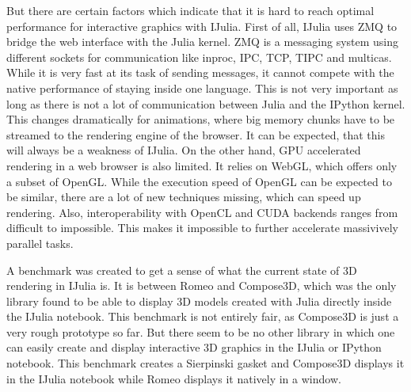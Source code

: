 But there are certain factors which indicate that it is hard to reach optimal performance for interactive graphics with IJulia.
First of all, IJulia uses ZMQ to bridge the web interface with the Julia kernel.
ZMQ\cite{ZMQ} is a messaging system using different sockets for communication like inproc, IPC, TCP, TIPC and multicas.
While it is very fast at its task of sending messages, it cannot compete with the native performance of staying inside one language.
This is not very important as long as there is not a lot of communication between Julia and the IPython kernel. This changes dramatically for animations, where big memory chunks have to be streamed to the rendering engine of the browser. It can be expected, that this will always be a weakness of IJulia.
On the other hand, \ac{GPU} accelerated rendering in a web browser is also limited.
It relies on \ac{WebGL}, which offers only a subset of OpenGL. While the execution speed of OpenGL can be expected to be similar, there are a lot of new techniques missing, which can speed up rendering. Also, interoperability with \ac{OpenCL} and \ac{CUDA} backends ranges from difficult to impossible. 
This makes it impossible to further accelerate massivively parallel tasks.

A benchmark was created to get a sense of what the current state of 3D rendering in IJulia is.
It is between Romeo and Compose3D\cite{Compose3D}, which was the only library found to be able to display 3D models created with Julia directly inside the IJulia notebook.
This benchmark is not entirely fair, as Compose3D is just a very rough prototype so far. 
But there seem to be no other library in which one can easily create and display interactive 3D graphics in the IJulia or IPython notebook. 
This benchmark creates a Sierpinski gasket and Compose3D displays it in the IJulia notebook while Romeo displays it natively in a window.

